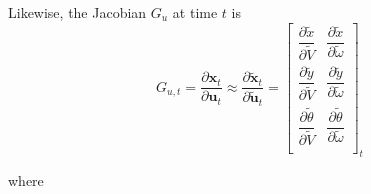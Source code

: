 \documentclass{article}
\begin{document}
\begin{enumerate}[label=(\roman*)]
Likewise, the Jacobian $G_u$ at time $t$ is
\begin{equation}
G_{u,t}
= \frac{\partial \mathbf{x}_t}{\partial \mathbf{u}_t}
\approx \frac{\partial \tilde{\mathbf{x}}_t}{\partial \tilde{\mathbf{u}}_t}
= \begin{bmatrix}
\dfrac{\partial \tilde x}{\partial \tilde V} & \dfrac{\partial \tilde x}{\partial \tilde \omega} \\[6pt]
\dfrac{\partial \tilde y}{\partial \tilde V} & \dfrac{\partial \tilde y}{\partial \tilde \omega} \\[6pt]
\dfrac{\partial \tilde \theta}{\partial \tilde V} & \dfrac{\partial \tilde \theta}{\partial \tilde \omega} \\
\end{bmatrix}_t
\end{equation}

where


\end{enumerate}
\end{document}
